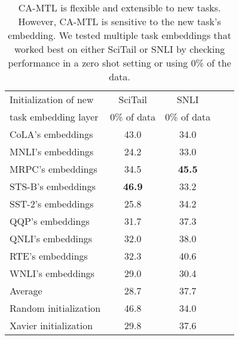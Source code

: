 \documentclass{article} \usepackage{iclr2021_conference,times}
\begin{document}
\begin{table}[hbt]
\caption{\small CA-MTL is flexible and extensible to new tasks. However, CA-MTL is sensitive to the new task's embedding. We tested multiple task embeddings that worked best on either SciTail or SNLI by checking performance in a zero shot setting or using 0\% of the data.}
\begin{center}
\small
\begin{tabular}{|l|c|c|c|c|}
	\hline 
		Initialization of new & SciTail     & SNLI       \\
		task embedding layer  & 0\% of data & 0\% of data \\
		\hline
        CoLA's embeddings  & 43.0 & 34.0 \\
        MNLI's embeddings  & 24.2 & 33.0 \\
        MRPC's embeddings  & 34.5 & \textbf{45.5} \\
        STS-B's embeddings  & \textbf{46.9} & 33.2 \\
        SST-2's embeddings  & 25.8 & 34.2 \\
        QQP's embeddings   & 31.7 & 37.3  \\
        QNLI's embeddings   & 32.0 & 38.0 \\
        RTE's embeddings   & 32.3 & 40.6  \\
        WNLI's embeddings   & 29.0 & 30.4 \\
        Average  & 28.7 &  37.7 \\
        Random initialization & 46.8 & 34.0 \\
        Xavier initialization & 29.8 &  37.6 \\
    \hline
\end{tabular}
\end{center}

\label{table:data_zero_shot}
\end{table}
\end{document}
